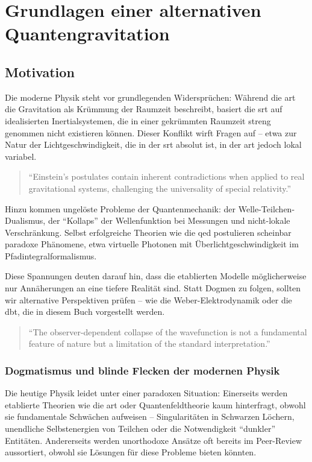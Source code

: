 \chapter{Grundlagen einer alternativen Quantengravitation}
\section{Motivation}
Die moderne Physik steht vor grundlegenden Widersprüchen: Während die \gls{art} die Gravitation als Krümmung der Raumzeit beschreibt, basiert die \gls{srt} auf idealisierten Inertialsystemen,
die in einer gekrümmten Raumzeit streng genommen nicht existieren können. Dieser Konflikt wirft Fragen auf – etwa zur Natur der Lichtgeschwindigkeit, die in der \gls{srt} absolut ist, in der
\gls{art} jedoch lokal variabel.
\begin{quote}
    \enquote{Einstein's postulates contain inherent contradictions when applied to real gravitational systems, challenging the universality of special relativity.} \cite{Rubcic1998}
\end{quote}
Hinzu kommen ungelöste Probleme der Quantenmechanik: der Welle-Teilchen-Dualismus, der \enquote{Kollaps} der Wellenfunktion bei Messungen und nicht-lokale Verschränkung. Selbst erfolgreiche
Theorien wie die \gls{qed} postulieren scheinbar paradoxe Phänomene, etwa virtuelle Photonen mit Überlichtgeschwindigkeit im Pfadintegralformalismus.

Diese Spannungen deuten darauf hin, dass die etablierten Modelle möglicherweise nur Annäherungen an eine tiefere Realität sind. Statt Dogmen zu folgen, sollten wir alternative Perspektiven
prüfen – wie die Weber-Elektrodynamik oder die \gls{dbt}, die in diesem Buch vorgestellt werden.
\begin{quote}
    \enquote{The observer-dependent collapse of the wavefunction is not a fundamental feature of nature but a limitation of the standard interpretation.} \cite{bohm1952}
\end{quote}

\subsection{Dogmatismus und blinde Flecken der modernen Physik}
Die heutige Physik leidet unter einer paradoxen Situation: Einerseits werden etablierte Theorien wie die \gls{art} oder Quantenfeldtheorie kaum hinterfragt, obwohl sie fundamentale Schwächen
aufweisen – Singularitäten in Schwarzen Löchern, unendliche Selbstenergien von Teilchen oder die Notwendigkeit \enquote{dunkler} Entitäten. Andererseits werden unorthodoxe Ansätze oft bereits
im Peer-Review aussortiert, obwohl sie Lösungen für diese Probleme bieten könnten.

